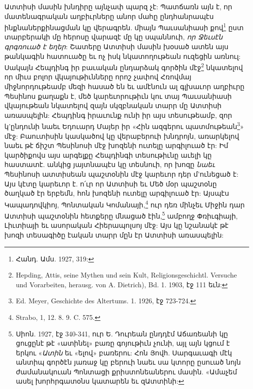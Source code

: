 \documentclass{article}
\begin{document}
{Ատտիսի մասին խնդիրը այնչափ պարզ չէ: Պատճառն այն է, որ մատենագրական աղբիւրները անոր մահը ընդհանրապէս ինքնաներքինացման կը վերագրեն. միայն Պաւսանիասի քով\footnote{Հանդ. Ամս. 1927, 319:} ըստ տարբերակի մը հերոսը վարազէ մը կը սպաննուի, \emph{որ Ջեւսէն գրգռուած է եղեր}: Շատերը Ատտիսի մասին խօսած ատեն այս թանկագին հատուածը եւ ոչ իսկ նկատողութեան ուզեցին առնուլ: Սակայն Հեպդինգ իր բաւական ընդարձակ գործին մէջ\footnote{Hepding, Attis, seine Mythen und sein Kult, Religionsgeschichtl. Versuche und Vorarbeiten, herausg. von A. Dietrich), Bd. 1. 1903, էջ 111 եւն:} նկատելով որ միւս բոլոր վկայութիւնները որոշ չափով Հռովմայ միջնորդութեամբ մեզի հասած են եւ ամէնուն ալ գլխաւոր աղբիւրը Պեսինոս քաղաքն է, մեծ կարեւորութիւն կու տայ Պաւսանիասի վկայութեան նկատելով զայն սկզբնական տարր մը Ատտիսի առասպելին: Հեպդինգ իրաւունք ունի իր այս տեսութեամբ, զոր կ'ընդունի նաեւ Եդուարդ Մայեր իր «Հին ազգերու պատմութեան\footnote{Ed. Meyer, Geschichte des Altertums. 1. 1926, էջ 723-724.}» մէջ: Բաուտիսին կասկածով կը վերաբերուի խնդրոյն, առարկելով նաեւ թէ ճիշտ Պեսինոսի մէջ խոզենի ուտելը արգիլուած էր: Իմ կարծիքովս այս արգելքը Հեպդինգի տեսութիւնը աւելի կը հաստատէ. անկից յայտնապէս կը տեսնուի, որ խոզը \emph{նաեւ} Պեսինոսի ատտիսեան պաշտօնին մէջ կարեւոր դեր մ'ունեցած է: Այս կէտը կարեւոր է. ո՛ւր որ Ատտիսի եւ Մեծ մօր պաշտօնը ծաղկած էր երբեմն, հոն խոզենի ուտելը արգիլուած էր: Այսպէս Կապադովկիոյ, Պոնտական Կոմանայի,\footnote{Strabo, 1, 12. 8. 9. C. 575.} ուր դեռ մինչեւ Միջին դար Ատտիսի պաշտօնին հետքերը մնացած էին,\footnote{Սիոն. 1927, էջ 340-341, ուր Ե. Դուրեան ընդդէմ Աճառեանի կը ցուցընէ թէ «ատինել» բառը գոյութիւն չունի, այլ այն կցում է երկու «\emph{Ատին} եւ «ելով» բառերու: Հոն Յովհ. Սարգաւագի մէկ անտիպ գործէն յառաջ կը բերուի նաեւ սա կտորը ըսուած նոյն ժամանակուան Պոնտացի քրիստոնեաներու մասին. «Ամաչեմ ասել խորհրգատօնս կատարեն եւ զԱտտինի:} ամբողջ Փռիւգիայի, Լիւտիայի եւ ասորական Հիերապոլսոյ մէջ: Այս կը նշանակէ թէ խոզի տեսագիծը էական տարր մըն էր Ատտիսի առասպելին:

}
\end{document}
